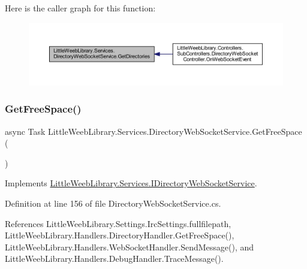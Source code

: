 Here is the caller graph for this function\+:\nopagebreak
\begin{figure}[H]
\begin{center}
\leavevmode
\includegraphics[width=350pt]{class_little_weeb_library_1_1_services_1_1_directory_web_socket_service_a1fee74b9f658b29f4c2bb643a48425e0_icgraph}
\end{center}
\end{figure}
\mbox{\label{class_little_weeb_library_1_1_services_1_1_directory_web_socket_service_a37c3c5de12db8083e8e6d22ce1fe6776}} 
\subsubsection{\texorpdfstring{Get\+Free\+Space()}{GetFreeSpace()}}
{\footnotesize\ttfamily async Task Little\+Weeb\+Library.\+Services.\+Directory\+Web\+Socket\+Service.\+Get\+Free\+Space (\begin{DoxyParamCaption}{ }\end{DoxyParamCaption})}



Implements \mbox{\hyperlink{interface_little_weeb_library_1_1_services_1_1_i_directory_web_socket_service_a0a28e43d70bf2d5904bb4e59d1cd6cd7}{Little\+Weeb\+Library.\+Services.\+I\+Directory\+Web\+Socket\+Service}}.



Definition at line 156 of file Directory\+Web\+Socket\+Service.\+cs.



References Little\+Weeb\+Library.\+Settings.\+Irc\+Settings.\+fullfilepath, Little\+Weeb\+Library.\+Handlers.\+Directory\+Handler.\+Get\+Free\+Space(), Little\+Weeb\+Library.\+Handlers.\+Web\+Socket\+Handler.\+Send\+Message(), and Little\+Weeb\+Library.\+Handlers.\+Debug\+Handler.\+Trace\+Message().



